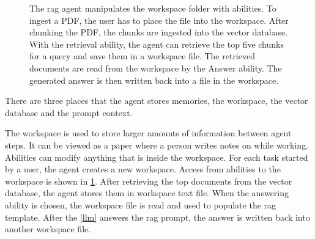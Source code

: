 \documentclass[../main.tex]{subfiles}
\begin{document}
\begin{figure}[t]
    \centering
    \caption{The \gls{rag} agent manipulates the \textcolor{emph red}{workspace}
        folder with \textcolor{emph blue}{abilities}.
        To ingest a PDF, the user has to place the file into the workspace.
        After chunking the PDF, the chunks are ingested into the vector database.
        With the retrieval ability,
        the agent can retrieve the top five chunks for a query
        and save them in a workspace file.
        The retrieved documents are read from the workspace by the Answer ability.
        The generated answer is then written back into a file in the workspace.}
    \label{fig:abilities_workspace}
\end{figure}


There are three places that the agent stores memories, the workspace,
the vector database and the prompt context.

The workspace is used to store larger amounts of information between agent steps.
It can be viewed as a paper where a person writes notes on while working.
Abilities can modify anything that is inside the workspace.
For each task started by a user, the agent creates a new workspace.
Access from abilities to the workspace is shown in \ref{fig:abilities_workspace}.
After retrieving the top documents from the vector database, the agent stores
them in workspace text file.
When the answering ability is chosen, the workspace file is read and used to populate
the \gls{rag} template.
After the \ref{llm} answers the \gls{rag} prompt, the answer is written back
into another workspace file.
\end{document}
